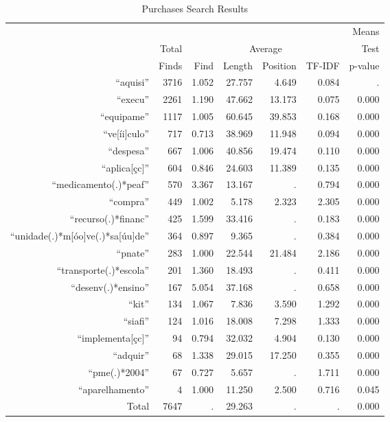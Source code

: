 \begin{table}[!htbp]
  \caption{\label{tab:purchasesresults} Purchases Search Results}
  \centering
  \small
  \begin{tabular}{rrrrrrr}
  \hline

  \hline
  \multicolumn{6}{c}{} & Means \T \B \\
  & Total & \multicolumn{4}{c}{Average} & Test \T \B \\ \cline{3-6}
  & Finds & Find & Length & Position & TF-IDF & p-value \T \B \\
  \hline
  ``aquisi'' & 3716 & 1.052 & 27.757 & 4.649 & 0.084 & . \T \B \\
  ``execu'' & 2261 & 1.190 & 47.662 & 13.173 & 0.075 & 0.000 \T \B \\
  ``equipame'' & 1117 & 1.005 & 60.645 & 39.853 & 0.168 & 0.000 \T \B \\
  ``ve{[}íi{]}culo'' & 717 & 0.713 & 38.969 & 11.948 & 0.094 & 0.000 \T \B \\
  ``despesa'' & 667 & 1.006 & 40.856 & 19.474 & 0.110 & 0.000 \T \B \\
  ``aplica{[}çc{]}'' & 604 & 0.846 & 24.603 & 11.389 & 0.135 & 0.000 \T \B \\
  ``medicamento(.)*peaf'' & 570 & 3.367 & 13.167 & . & 0.794 & 0.000 \T \B \\
  ``compra'' & 449 & 1.002 & 5.178 & 2.323 & 2.305 & 0.000 \T \B \\
  ``recurso(.)*financ'' & 425 & 1.599 & 33.416 & . & 0.183 & 0.000 \T \B \\
  ``unidade(.)*m{[}óo{]}ve(.)*sa{[}úu{]}de'' & 364 & 0.897 & 9.365 & . & 0.384 & 0.000 \T \B \\
  ``pnate'' & 283 & 1.000 & 22.544 & 21.484 & 2.186 & 0.000 \T \B \\
  ``transporte(.)*escola'' & 201 & 1.360 & 18.493 & . & 0.411 & 0.000 \T \B \\
  ``desenv(.)*ensino'' & 167 & 5.054 & 37.168 & . & 0.658 & 0.000 \T \B \\
  ``kit'' & 134 & 1.067 & 7.836 & 3.590 & 1.292 & 0.000 \T \B \\
  ``siafi'' & 124 & 1.016 & 18.008 & 7.298 & 1.333 & 0.000 \T \B \\
  ``implementa{[}çc{]}'' & 94 & 0.794 & 32.032 & 4.904 & 0.130 & 0.000 \T \B \\
  ``adquir'' & 68 & 1.338 & 29.015 & 17.250 & 0.355 & 0.000 \T \B \\
  ``pme(.)*2004'' & 67 & 0.727 & 5.657 & . & 1.711 & 0.000 \T \B \\
  ``aparelhamento'' & 4 & 1.000 & 11.250 & 2.500 & 0.716 & 0.045 \T \B \\ \hline
   Total & 7647 & . & 29.263 & . & . & 0.000 \T \B \\
  \hline

  \hline
  \end{tabular}
\end{table}
